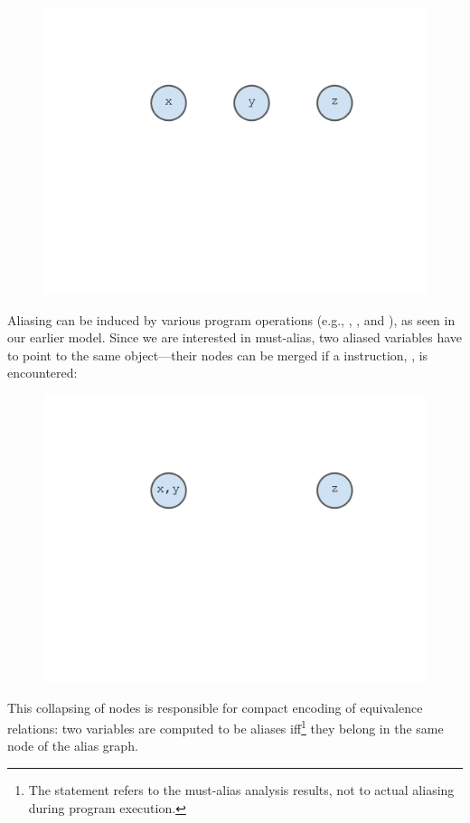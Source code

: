 \begin{figure}[h]
\centering
\includegraphics[trim={35mm 115mm 35mm 51mm},clip,width=0.8\linewidth]{assets/must-data/alias-graph0.pdf}
\end{figure}

Aliasing can be induced by various program operations (e.g., , , and ), as seen in our earlier model. Since we are interested in must-alias, two aliased variables have to point to the same object---their nodes can be merged if a  instruction, , is encountered:

\begin{figure}[h]
\centering
\includegraphics[trim={35mm 115mm 35mm 51mm},clip,width=0.8\linewidth]{assets/must-data/alias-graph1.pdf}
\end{figure}

This collapsing of nodes is responsible for compact encoding of equivalence relations: two variables are computed to be aliases iff\footnote{The statement refers to the must-alias analysis results, not to actual aliasing during program execution.} they belong in the same node of the alias graph.

